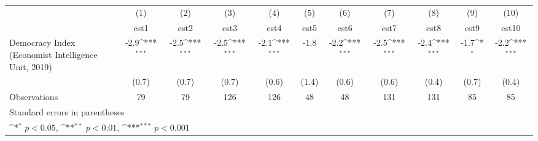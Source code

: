 {
\def\sym#1{\ifmmode^{#1}\else\(^{#1}\)\fi}
\begin{tabular}{l*{10}{c}}
\hline\hline
                    &\multicolumn{1}{c}{(1)}         &\multicolumn{1}{c}{(2)}         &\multicolumn{1}{c}{(3)}         &\multicolumn{1}{c}{(4)}         &\multicolumn{1}{c}{(5)}         &\multicolumn{1}{c}{(6)}         &\multicolumn{1}{c}{(7)}         &\multicolumn{1}{c}{(8)}         &\multicolumn{1}{c}{(9)}         &\multicolumn{1}{c}{(10)}         \\
                    &        est1         &        est2         &        est3         &        est4         &        est5         &        est6         &        est7         &        est8         &        est9         &       est10         \\
\hline
Democracy Index (Economist Intelligence Unit, 2019)&        -2.9\sym{***}&        -2.5\sym{***}&        -2.5\sym{***}&        -2.1\sym{***}&        -1.8         &        -2.2\sym{***}&        -2.5\sym{***}&        -2.4\sym{***}&        -1.7\sym{*}  &        -2.2\sym{***}\\
                    &       (0.7)         &       (0.7)         &       (0.7)         &       (0.6)         &       (1.4)         &       (0.6)         &       (0.6)         &       (0.4)         &       (0.7)         &       (0.4)         \\
\hline
Observations        &          79         &          79         &         126         &         126         &          48         &          48         &         131         &         131         &          85         &          85         \\
\hline\hline
\multicolumn{11}{l}{\footnotesize Standard errors in parentheses}\\
\multicolumn{11}{l}{\footnotesize \sym{*} \(p<0.05\), \sym{**} \(p<0.01\), \sym{***} \(p<0.001\)}\\
\end{tabular}
}
